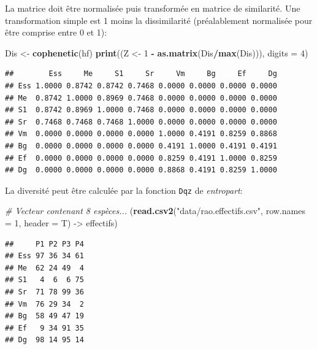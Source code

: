 \documentclass[
  11pt,
  french,
  a4paper,
  extrafontsizes,onecolumn,openright
  ]{memoir}
\newenvironment{Shaded}{\begin{snugshade}}{\end{snugshade}}
\newcommand{\CommentTok}[1]{\textcolor[rgb]{0.56,0.35,0.01}{\textit{#1}}}
\newcommand{\DataTypeTok}[1]{\textcolor[rgb]{0.13,0.29,0.53}{#1}}
\newcommand{\DecValTok}[1]{\textcolor[rgb]{0.00,0.00,0.81}{#1}}
\newcommand{\KeywordTok}[1]{\textcolor[rgb]{0.13,0.29,0.53}{\textbf{#1}}}
\newcommand{\NormalTok}[1]{#1}
\newcommand{\OperatorTok}[1]{\textcolor[rgb]{0.81,0.36,0.00}{\textbf{#1}}}
\newcommand{\StringTok}[1]{\textcolor[rgb]{0.31,0.60,0.02}{#1}}
\begin{document}
\normalsize

La matrice doit être normalisée puis transformée en matrice de similarité.
Une transformation simple est 1 moins la dissimilarité (préalablement normalisée pour être comprise entre 0 et 1):

\scriptsize

\begin{Shaded}
\begin{Highlighting}[]
\NormalTok{Dis <-}\StringTok{ }\KeywordTok{cophenetic}\NormalTok{(hf)}
\KeywordTok{print}\NormalTok{((Z <-}\StringTok{ }\DecValTok{1} \OperatorTok{-}\StringTok{ }\KeywordTok{as.matrix}\NormalTok{(Dis}\OperatorTok{/}\KeywordTok{max}\NormalTok{(Dis))), }\DataTypeTok{digits =} \DecValTok{4}\NormalTok{)}
\end{Highlighting}
\end{Shaded}

\begin{verbatim}
##        Ess     Me     S1     Sr     Vm     Bg     Ef     Dg
## Ess 1.0000 0.8742 0.8742 0.7468 0.0000 0.0000 0.0000 0.0000
## Me  0.8742 1.0000 0.8969 0.7468 0.0000 0.0000 0.0000 0.0000
## S1  0.8742 0.8969 1.0000 0.7468 0.0000 0.0000 0.0000 0.0000
## Sr  0.7468 0.7468 0.7468 1.0000 0.0000 0.0000 0.0000 0.0000
## Vm  0.0000 0.0000 0.0000 0.0000 1.0000 0.4191 0.8259 0.8868
## Bg  0.0000 0.0000 0.0000 0.0000 0.4191 1.0000 0.4191 0.4191
## Ef  0.0000 0.0000 0.0000 0.0000 0.8259 0.4191 1.0000 0.8259
## Dg  0.0000 0.0000 0.0000 0.0000 0.8868 0.4191 0.8259 1.0000
\end{verbatim}

\normalsize

La diversité peut être calculée par la fonction \texttt{Dqz} de \emph{entropart}:

\scriptsize

\begin{Shaded}
\begin{Highlighting}[]
\CommentTok{# Vecteur contenant 8 espèces...}
\NormalTok{(}\KeywordTok{read.csv2}\NormalTok{(}\StringTok{"data/rao.effectifs.csv"}\NormalTok{, }\DataTypeTok{row.names =} \DecValTok{1}\NormalTok{, }\DataTypeTok{header =}\NormalTok{ T) ->}
\StringTok{    }\NormalTok{effectifs)}
\end{Highlighting}
\end{Shaded}

\begin{verbatim}
##     P1 P2 P3 P4
## Ess 97 36 34 61
## Me  62 24 49  4
## S1   4  6  6 75
## Sr  71 78 99 36
## Vm  76 29 34  2
## Bg  58 49 47 19
## Ef   9 34 91 35
## Dg  98 14 95 14
\end{verbatim}
\end{document}
